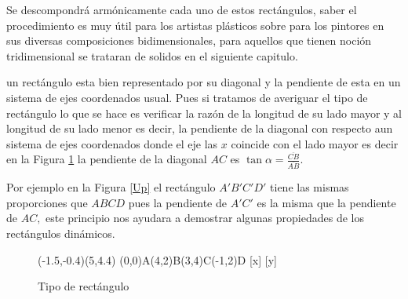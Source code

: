 Se descompondrá armónicamente cada uno de estos rectángulos, saber el procedimiento es muy útil para los artistas plásticos sobre para los pintores en sus diversas composiciones bidimensionales, para aquellos que tienen noción tridimensional  se trataran de solidos en el siguiente capitulo.

\begin{comen}\label{com1} un rectángulo esta bien representado por su diagonal y la pendiente de esta en un sistema de ejes coordenados usual. Pues si tratamos de averiguar el tipo de rectángulo  lo que se hace es verificar  la razón de la longitud de su lado mayor y al longitud de su lado menor es decir, la pendiente de la diagonal con respecto aun sistema de ejes coordenados donde el eje las $x$ coincide con el lado mayor es decir en la Figura \ref{Op} la pendiente de la diagonal $AC$ es $\tan{\alpha}=\frac{\overline{CB}}{\overline{AB}}.$

	Por ejemplo en la Figura \ref{Up} el rectángulo $A'B'C'D'$ tiene las mismas proporciones que $ABCD$ pues la pendiente de $A'C'$ es la misma que la pendiente de $AC,$ este principio nos ayudara a demostrar algunas propiedades de los rectángulos dinámicos.
	\begin{figure}[!ht]
		\begin{center}
			\begin{pspicture}(-1.5,-0.4)(5,4.4)
				\pstGeonode[CurveType=polygon,unit=1,PosAngle={-110,-90,90,-115}](0,0){A}(4,2){B}(3,4){C}(-1,2){D}
				[x]
				[y]
			\end{pspicture}
		\end{center}
		\caption{Tipo de rectángulo}\label{Op}
	\end{figure}


\end{comen}



